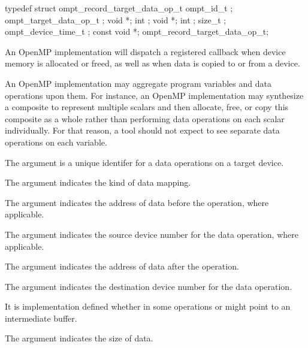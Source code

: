 \record

\begin{ccppspecific}
\begin{omptRecord}
typedef struct ompt_record_target_data_op_t {
  ompt_id_t ;
  ompt_target_data_op_t ;
  void *;
  int ;
  void *;
  int ;
  size_t ;
  ompt_device_time_t ;
  const void *;
} ompt_record_target_data_op_t;
\end{omptRecord}
\end{ccppspecific}


\descr
An OpenMP implementation will dispatch a registered  callback
when device memory is allocated or freed, as well as when data is copied to or from a device.

\begin{note}
An OpenMP implementation may aggregate program variables and data
operations upon them.  For instance, an OpenMP implementation may
synthesize a composite to represent multiple scalars and then
allocate, free, or copy this composite as a whole rather than
performing data operations on each scalar individually.  For that
reason, a tool should not expect to see separate data operations
on each variable.
\end{note}

\argdesc

The argument  is a unique identifer for a data
operations on a target device.

The argument  indicates the kind of data mapping.

The argument  indicates the address of data
before the operation, where applicable.

The argument  indicates the source device number
for the data operation, where applicable.

The argument  indicates the address of data
after the operation.

The argument  indicates the destination device
number for the data operation.

It is implementation defined whether in some operations 
or  might point to an intermediate buffer.

The argument  indicates the size of data.

\codeptrdesc

